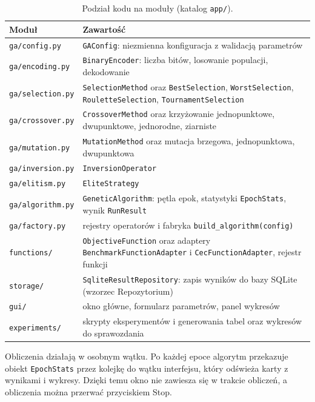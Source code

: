 \documentclass[11pt,a4paper]{article}
\begin{document}
\begin{table}[H]
\centering
\small
\begin{tabularx}{\textwidth}{lX}
\toprule
Moduł & Zawartość \\
\midrule
\texttt{ga/config.py} & \texttt{GAConfig}: niezmienna konfiguracja z walidacją parametrów \\
\texttt{ga/encoding.py} & \texttt{BinaryEncoder}: liczba bitów, losowanie populacji, dekodowanie \\
\texttt{ga/selection.py} & \texttt{SelectionMethod} oraz \texttt{BestSelection}, \texttt{WorstSelection}, \texttt{RouletteSelection}, \texttt{TournamentSelection} \\
\texttt{ga/crossover.py} & \texttt{CrossoverMethod} oraz krzyżowanie jednopunktowe, dwupunktowe, jednorodne, ziarniste \\
\texttt{ga/mutation.py} & \texttt{MutationMethod} oraz mutacja brzegowa, jednopunktowa, dwupunktowa \\
\texttt{ga/inversion.py} & \texttt{InversionOperator} \\
\texttt{ga/elitism.py} & \texttt{EliteStrategy} \\
\texttt{ga/algorithm.py} & \texttt{GeneticAlgorithm}: pętla epok, statystyki \texttt{EpochStats}, wynik \texttt{RunResult} \\
\texttt{ga/factory.py} & rejestry operatorów i fabryka \texttt{build\_algorithm(config)} \\
\texttt{functions/} & \texttt{ObjectiveFunction} oraz adaptery \texttt{BenchmarkFunctionAdapter} i \texttt{CecFunctionAdapter}, rejestr funkcji \\
\texttt{storage/} & \texttt{SqliteResultRepository}: zapis wyników do bazy SQLite (wzorzec Repozytorium) \\
\texttt{gui/} & okno główne, formularz parametrów, panel wykresów \\
\texttt{experiments/} & skrypty eksperymentów i generowania tabel oraz wykresów do sprawozdania \\
\bottomrule
\end{tabularx}
\caption{Podział kodu na moduły (katalog \texttt{app/}).}
\end{table}

Obliczenia działają w osobnym wątku. Po każdej epoce algorytm przekazuje obiekt \texttt{EpochStats}
przez kolejkę do wątku interfejsu, który odświeża karty z wynikami i wykresy. Dzięki temu okno
nie zawiesza się w trakcie obliczeń, a obliczenia można przerwać przyciskiem Stop.
\end{document}

